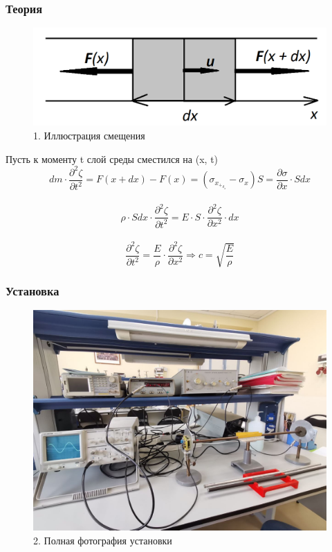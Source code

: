 \documentclass[xcolor=table]{beamer}
\begin{document}
\begin{frame}
\frametitle{Теория}
    \begin{figure}[t]
        \centering
        \includegraphics[width = 0.5\linewidth]{images/Wave equation.png}
        \caption{1. Иллюстрация смещения}
        \label{fig:my_label}
    \end{figure}
    \centering
    \begin{spacing}{0.1}
    \large Пусть к моменту t слой среды сместился на \zeta(x, t)\\
    \centering
    \large 
    $$dm \cdot \frac{\partial^2 \zeta}{\partial t^2} = F(x+dx) - F(x) = (\sigma_x_+_d_x - \sigma_x)S = \frac{\partial \sigma}{\partial x} \cdot Sdx$$ \\
    $$\rho \cdot S dx \cdot \frac{\partial^2 \zeta}{\partial t^2} = E \cdot S \cdot \frac{\partial^2 \zeta}{\partial x^2} \cdot dx$$ \\
    $$\frac{\partial^2 \zeta}{\partial t^2} = \frac{E}{\rho} \cdot \frac{\partial^2 \zeta}{\partial x^2} \Rightarrow c = \sqrt{\frac{E}{\rho}}$$
    \end{spacing}
\end{frame}


\begin{frame}
\frametitle{Установка}
\begin{figure}
    \centering
    \includegraphics[scale=0.2]{images/installation.jpg}
    \caption{2. Полная фотография установки}
    \label{fig:my_label}
\end{figure}
\end{frame}
\end{document}
